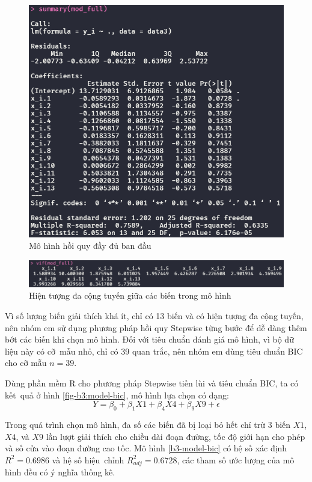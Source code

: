 \begin{figure}[H]
	\centering
	\includegraphics[width=0.65\linewidth]{images/B3/model-full}
	\caption{Mô hình hồi quy đầy đủ ban đầu}
	\label{fig-b3:model-full}
\end{figure}

\begin{figure}[H]
	\centering
	\includegraphics[width=0.8\linewidth]{images/B3/model-full-vif}
	\caption{Hiện tượng đa cộng tuyến giữa các biến trong mô hình}
	\label{fig-b3:model-full-vif}
\end{figure}

Vì số lượng biến giải thích khá ít, chỉ có 13 biến và có hiện tượng đa cộng tuyến, nên nhóm em sử dụng phương pháp hồi quy Stepwise từng bước để dễ dàng thêm bớt các biến khi chọn mô hình. Đối với tiêu chuẩn đánh giá mô hình, vì bộ dữ liệu này có cỡ~mẫu nhỏ, chỉ có 39 quan trắc, nên nhóm em dùng tiêu chuẩn BIC cho cỡ mẫu $n=39$.

Dùng phần mềm R cho phương pháp Stepwise tiến lùi và tiêu chuẩn BIC, ta có kết~quả ở hình \ref{fig-b3:model-bic}, mô hình lựa chọn có dạng:
\begin{equation}\label{b3-model-bic}
	Y = \beta_0 + \beta_1X1 + \beta_4X4 + \beta_9X9 + \epsilon
\end{equation}

Trong quá trình chọn mô hình, đa số các biến đã bị loại bỏ hết chỉ trừ 3 biến $X1$, $X4$, và $X9$ lần lượt giải thích cho chiều dài đoạn đường, tốc độ giới hạn cho phép và số cửa vào đoạn đường cao tốc. Mô hình \ref{b3-model-bic} có hệ số xác định $R^2 = 0.6986$ và hệ số hiệu~chỉnh $R^2_{adj} = 0.6728$, các tham số ước lượng của mô hình đều có ý nghĩa thống kê. 

